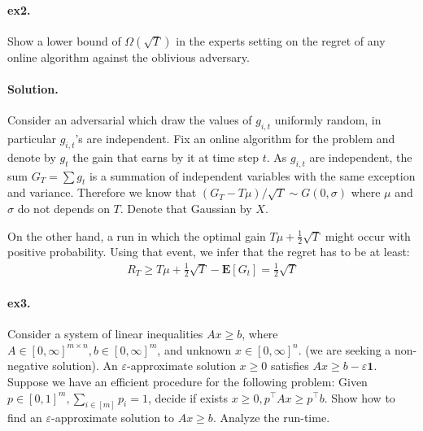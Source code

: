 \documentclass{article}
\newcommand{\expp}[1]{ \mathbf{E} \left[ {#1} \right]}
\begin{document}
\begin{multicols*}{2}
  \paragraph{ex2.} Show a lower bound of $\Omega\left( \sqrt{T} \right)$ in the experts setting on the regret of any online algorithm against the oblivious adversary. 

  \paragraph{Solution.} Consider an adversarial which draw the values of $g_{i,t}$ uniformly random, in particular $g_{i,t}$'s are independent. Fix an online algorithm for the problem and denote by $g_{t}$ the gain that earns by it at time step $t$. As $g_{i,t}$ are independent, the sum $G_{T} = \sum{g_{t}}$ is a summation of independent variables with the same exception and variance. Therefore we know that $\left( G_{T} - T\mu \right)/ \sqrt{T} \sim G\left( 0 , \sigma \right)$ where $\mu$ and $\sigma$ do not depends on $T$. Denote that Gaussian by $X$.

On the other hand, a run in which the optimal gain $T\mu+\frac{1}{2}\sqrt{T}$ might occur with positive probability. Using that event, we infer that the regret has to be at least: 
  \begin{equation*}
    \begin{split}
      R_{T} \ge T  \mu  + \frac{1}{2}\sqrt{T}- \expp{G_{t}} = \frac{1}{2}\sqrt{T}
    \end{split}
  \end{equation*}
  \paragraph{ex3.}Consider a system of linear inequalities $Ax \ge b$, where $A\in [0, \infty]^{m\times n} , b \in  [0, \infty]^{m}$, and unknown $x \in  [0, \infty]^{ n}$. (we are seeking a non-negative solution). An $\varepsilon$-approximate solution $x\ge 0$ satisfies $Ax\ge b - \varepsilon \mathbf{1}$. Suppose we have an efficient procedure for the following problem: Given $p \in [0,1]^{m}, \sum_{i \in [m]}{p_{i}} = 1$, decide if exists $x \ge 0, p^{\top}Ax \ge p^{\top}b$. Show how to find an $\varepsilon$-approximate solution to $Ax \ge b$. Analyze the run-time. 

\end{multicols*}
\end{document}

